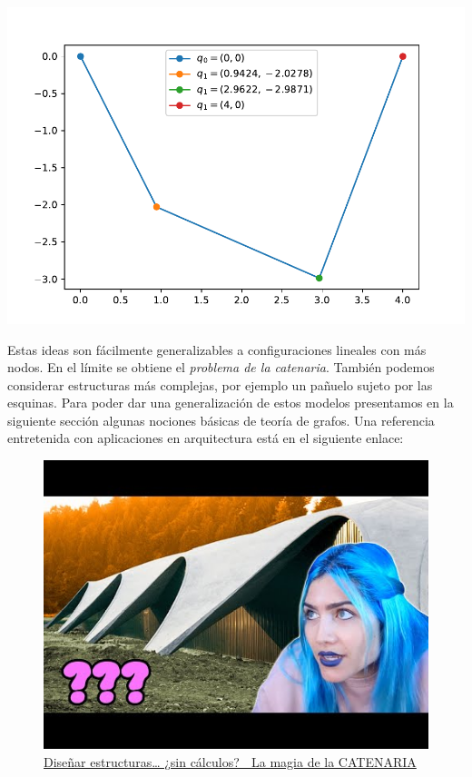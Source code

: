 \documentclass[
]{book}
\theoremstyle{definition}
\theoremstyle{definition}
\theoremstyle{definition}
\theoremstyle{definition}
\theoremstyle{remark}
\begin{document}
\includegraphics{bookdown_intro_files/figure-latex/unnamed-chunk-2-3.pdf}

Estas ideas son fácilmente generalizables a configuraciones lineales con más nodos. En el límite se obtiene el \emph{problema de la catenaria}. También podemos considerar estructuras más complejas, por ejemplo un pañuelo sujeto por las esquinas. Para poder dar una generalización de estos modelos presentamos en la siguiente sección algunas nociones básicas de teoría de grafos. Una referencia entretenida con aplicaciones en arquitectura está en el siguiente enlace:

\begin{figure}
\centering
\includegraphics{./0.jpg}
\caption{\href{https://youtu.be/KXP_kPPc7LY}{Diseñar estructuras\ldots{} ¿sin cálculos? 🤔 La magia de la CATENARIA}}
\end{figure}
\end{document}
